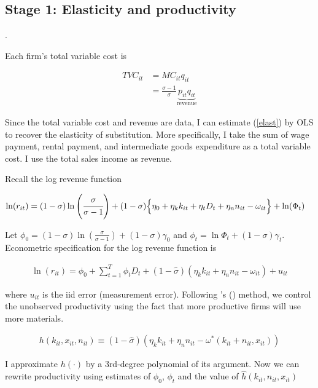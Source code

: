 \documentclass[11pt,letter]{article}
\newcommand{\prn}[1]{\left({#1}\right)}
\newcommand{\Lmprn}[1]{\Big\{{#1}\Big\}}
\begin{document}
\begin{appendices}
\subsection{Stage 1: Elasticity and productivity}\label{staticest}.

Each firm's total variable cost is

\begin{align}
TVC_{it} &= MC_{it}q_{it} \nonumber \\
&= \frac{\sigma-1}{\sigma} \underbrace{p_{it} q_{it}}_{\text{revenue}} \label{elast}
\end{align}

\noindent Since the total variable cost and revenue are data, I can estimate  (\ref{elast}) by OLS to recover the elasticity of substitution. More specifically, I take the sum of wage payment, rental payment, and intermediate goods expenditure as a total variable cost. I use the total sales income as revenue.

Recall the log revenue function

\begin{align*}
\ln (r_{it}) &= (1-\sigma)\ln\prn{\cfrac{\sigma}{\sigma-1}} + (1-\sigma)\Lmprn{ \eta_0 + \eta_k k_{it} + \eta_t D_t + \eta_n n_{it} - \omega_{it}} + \ln({\Phi_t})
\end{align*}

\noindent Let $\phi_0=(1-\sigma)\ln\prn{\frac{\sigma}{\sigma-1}} + (1-\sigma)\gamma_0$ and $\phi_t = \ln \Phi_t + (1-\sigma)\gamma_t$. Econometric specification for the log revenue function is

\begin{align}
\ln (r_{it})  = \phi_0 + \sum_{t=1}^T \phi_t D_t + (1-\hat{\sigma})(\eta_k k_{it} + \eta_n n_{it} - \omega_{it}) + u_{it} \label{logrevenue}
\end{align}

\noindent where $u_{it}$ is the iid error (measurement error). Following \citeauthor{Levinsohn2003}'s (\citeyear{Levinsohn2003}) method, we control the unobserved productivity using the fact that more productive firms will use more materials. 

\begin{align}
h(k_{it},x_{it},n_{it}) \equiv (1-\hat{\sigma})(\eta_k k_{it}+\eta_n n_{it} - \omega^* (k_{it}+n_{it},x_{it})  ) \label{control}
\end{align}

\noindent I approximate $h(\cdot)$ by a 3rd-degree polynomial of its argument. Now we can rewrite productivity using estimates of $\phi_0$, $\phi_t$ and the value of $\hat{h}(k_{it},n_{it},x_{it})$ 


\end{appendices}
\end{document}
